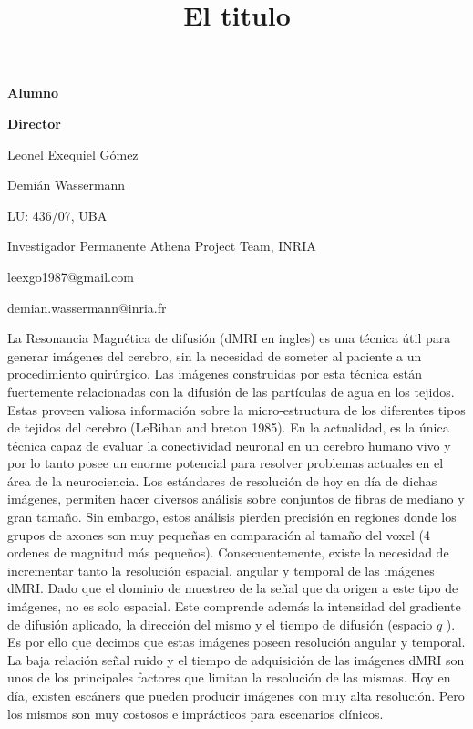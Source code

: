 \documentclass[a4paper,10pt]{article}
\title{El titulo}
\newcommand\textline[3][t]{%
  \par\smallskip\noindent\parbox[#1]{.333\textwidth}
  {\raggedright#3}%
  \parbox[#1]{.658\textwidth}{\raggedleft#2}%
}
\begin{document}
{
\textline[t]{\textbf{Director}}{\textbf{Alumno}}
\textline[t]{Demián Wassermann}{Leonel Exequiel G\'omez}
\textline[t]{Investigador Permanente Athena Project Team, INRIA}{LU: 436/07, UBA}
\textline[t]{demian.wassermann@inria.fr}{leexgo1987@gmail.com}
}





\vspace{2cm}


La Resonancia Magnética de difusión (dMRI en ingles) es una técnica útil para generar imágenes del 
cerebro, sin la necesidad de someter al paciente a un procedimiento quirúrgico. Las imágenes 
construidas por esta técnica están fuertemente relacionadas con la difusión de las partículas de agua en los tejidos. 
Estas proveen valiosa información sobre la micro-estructura de los diferentes tipos de tejidos del cerebro 
(LeBihan and breton 1985). En la actualidad, es la única técnica capaz de evaluar 
la conectividad neuronal en un cerebro humano vivo y por lo tanto posee un enorme potencial para resolver problemas 
actuales en el área de la neurociencia. Los estándares de resolución de hoy en día de dichas imágenes, permiten hacer 
diversos análisis sobre conjuntos de fibras de mediano y gran tamaño. Sin embargo, estos análisis 
pierden precisión en regiones donde los grupos de axones son muy pequeñas en comparación al tamaño del voxel (4 ordenes 
de magnitud más pequeños). Consecuentemente, existe la necesidad de incrementar tanto la resolución 
espacial, angular y temporal de 
las imágenes dMRI. Dado que el dominio de muestreo de la señal que da origen a este tipo de imágenes, no es solo 
espacial. Este comprende además la intensidad del gradiente de difusión aplicado, la dirección del mismo y el 
tiempo de difusión (espacio $q$ \citep{CALLAGHAN1990177}). Es por ello que decimos que estas imágenes poseen resolución 
angular y temporal. La baja relación señal ruido y el tiempo de adquisición de las imágenes dMRI son unos de los 
principales factores que limitan la resolución de las mismas. %
Hoy en día, existen escáners que pueden 
producir imágenes con muy alta resolución. Pero los mismos son muy costosos e 
imprácticos para escenarios clínicos.
\end{document}
